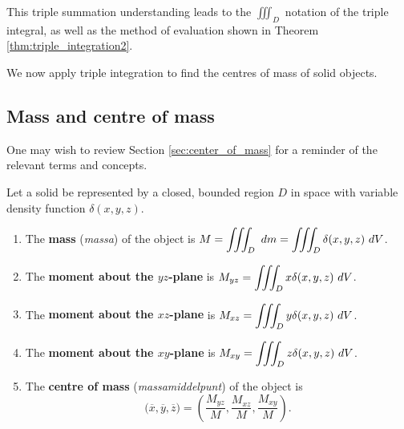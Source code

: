 This triple summation understanding leads to the $\iiint_D$ notation of the triple integral, as well as the method of evaluation shown in Theorem \ref{thm:triple_integration2}.

 We now apply triple integration to find the centres of mass of solid objects.
 
 
\subsection{Mass and centre of mass}

One may wish to review Section \ref{sec:center_of_mass} for a reminder of the relevant terms and concepts. 

\begin{definition}
\label{def:mass_3d}
Let a solid be represented by a closed, bounded region $D$ in space with variable density function $\delta(x,y,z)$. 
\begin{enumerate}
	\item The \textbf{mass} (\textit{massa}) of the object is $\ds M= \iiint_D \ dm=\iiint_D \delta(x,y,z)\ dV$.
	\item	The \textbf{moment about the $yz$-plane} is $\ds M_{yz}=\iiint_D x\delta(x,y,z)\ dV$.
	\item	The \textbf{moment about the $xz$-plane} is $\ds M_{xz}=\iiint_D y\delta(x,y,z)\ dV$.
	\item	The \textbf{moment about the $xy$-plane} is $\ds M_{xy}=\iiint_D z\delta(x,y,z)\ dV$.
	\item The \textbf{centre of mass} (\textit{massamiddelpunt}) of the object is
	$$\big(\overline{x},\overline{y},\overline{z}\big) = \left(\frac{M_{yz}}M,\frac{M_{xz}}M,\frac{M_{xy}}M\right).$$
\end{enumerate}
\end{definition}


